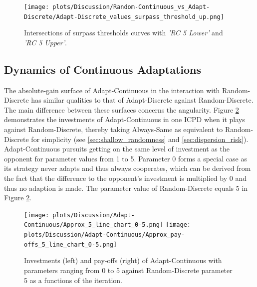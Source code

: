 \documentclass[11pt]{article}
\begin{document}
	\begin{figure}[h]
		\centering
		\texttt{[image: plots/Discussion/Random-Continuous\_vs\_Adapt-Discrete/Adapt-Discrete\_values\_surpass\_threshold\_up.png]}
		\caption{Intersections of surpass thresholds curves with \emph{'RC 5 Lower'} and \emph{'RC 5 Upper'}.}
		\label{fig:RndC_AdpD_peak}
	\end{figure}


\subsection{Dynamics of Continuous Adaptations} \label{sec:dynamics}
	
	The absolute-gain surface of Adapt-Continuous in the interaction with Random-Discrete has similar qualities to that of Adapt-Discrete against Random-Discrete.
	The main difference between these surfaces concerns the angularity.
	Figure \ref{fig:AC_approx_invetm_and_payoffs_0-5} demonstrates the investments of Adapt-Continuous in one ICPD when it plays against Random-Discrete, thereby taking Always-Same as equivalent to Random-Discrete for simplicity (see \ref{sec:shallow_randomness} and \ref{sec:dispersion_risk}).
	Adapt-Continuous pursuits getting on the same level of investment as the opponent for parameter values from 1 to 5.
	Parameter 0 forms a special case as its strategy never adapts and thus always cooperates, which can be derived from the fact that the difference to the opponent's investment is multiplied by 0 and thus no adaption is made.
	The parameter value of Random-Discrete equals 5 in Figure \ref{fig:AC_approx_invetm_and_payoffs_0-5}.

	\begin{figure}[h!]
		\centering
		\texttt{[image: plots/Discussion/Adapt-Continuous/Approx\_5\_line\_chart\_0-5.png]}
		\texttt{[image: plots/Discussion/Adapt-Continuous/Approx\_pay-offs\_5\_line\_chart\_0-5.png]}
		\caption{Investments (left) and pay-offs (right) of Adapt-Continuous with parameters ranging from 0 to 5 against Random-Discrete parameter 5 as a functions of the iteration.}
		\label{fig:AC_approx_invetm_and_payoffs_0-5}
	\end{figure}
	
\end{document}
